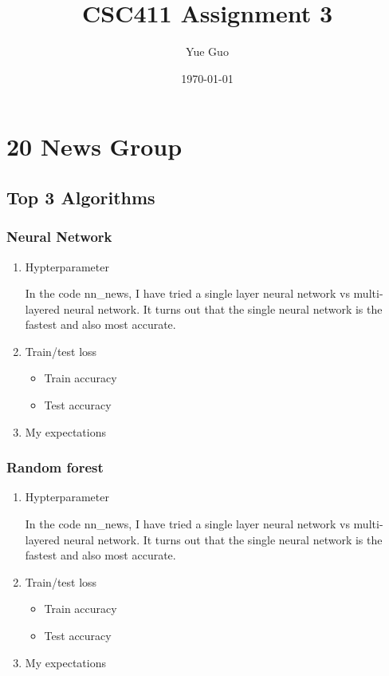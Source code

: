 \documentclass[letterpaper, 12]{article}
\date{\today}
\title{CSC411 Assignment 3}
\author{Yue Guo}
\begin{document}
\maketitle

\section{20 News Group}
\subsection{Top 3 Algorithms}
\subsubsection{Neural Network}
\begin{enumerate}

    \item Hypterparameter
	
	In the code nn\_news, I have tried a single layer neural network vs multi-layered neural network. It turns out that the single neural network is the fastest and also most accurate.

	\item Train/test loss
	\begin{itemize}
     \item  Train accuracy
     \item Test accuracy
        \end{itemize}
      \item My expectations
  
\end{enumerate}

\subsubsection{Random forest}
\begin{enumerate}

    \item Hypterparameter
	
	In the code nn\_news, I have tried a single layer neural network vs multi-layered neural network. It turns out that the single neural network is the fastest and also most accurate.

	\item Train/test loss
	\begin{itemize}
     \item  Train accuracy
     \item Test accuracy
        \end{itemize}
      \item My expectations
  
\end{enumerate}
\end{document}
